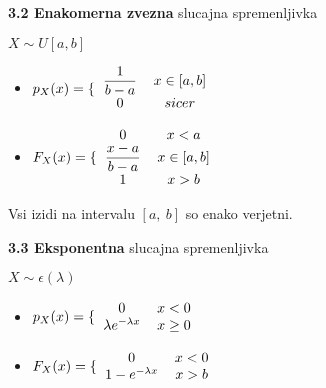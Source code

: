 \documentclass{article}
\begin{document}
\begin{multicols}{3}
\textbf{3.2 Enakomerna zvezna} slucajna spremenljivka
\begin{center}
    \begin{math}
        X \sim U[a, b]
    \end{math}
\end{center}

\begin{itemize}
    \item  \begin{math}
        p_{X}(x) =
        \{\begin{tabular}{ccc}
          $\dfrac{1}{b-a}$  & $x \in [a, b]$ & \\
          $0$ & $sicer$ & \\
        \end{tabular}
    \end{math} 
    
     \item \begin{math}
        F_{X}(x) =
        \{\begin{tabular}{ccc}
          $0$ & $x < a$ & \\
          $\dfrac{x - a}{b - a}$  & $x \in [a, b]$ & \\
          $1$ & $x > b$  & \\
        \end{tabular}
    \end{math}
\end{itemize}

Vsi izidi na intervalu $[a,\: b]$ so enako verjetni.

\textbf{3.3 Eksponentna} slucajna spremenljivka
\begin{center}
    \begin{math}
        X \sim \epsilon(\lambda)
    \end{math}
\end{center}

\begin{itemize}
    \item  \begin{math}
        p_{X}(x) =
        \{\begin{tabular}{ccc}
          $0$  & $x < 0$ & \\
          $\lambda e^{- \lambda x}$ & $x \geq 0$ & \\
        \end{tabular}
    \end{math} 
    
     \item \begin{math}
        F_{X}(x) =
        \{\begin{tabular}{ccc}
          $0$ & $x < 0$ & \\
          $1 - e^{- \lambda x}$ & $x > b$  & \\
        \end{tabular}
    \end{math}
\end{itemize}


\end{multicols}
\end{document}
